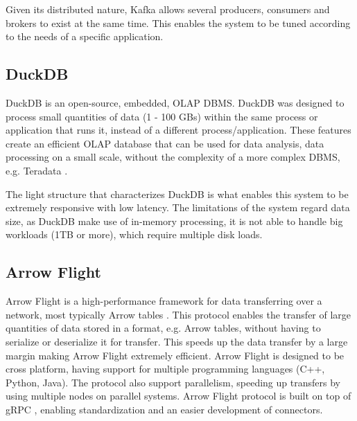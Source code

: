 Given its distributed nature, Kafka allows several producers, consumers and brokers to exist at the same time. This enables the system to be tuned according to the needs of a specific application. 

\subsection{DuckDB}

DuckDB \cite{raasveldtDuckDBEmbeddableAnalytical2019} is an open-source, embedded, \gls{OLAP} \gls{DBMS}. DuckDB was designed to process small quantities of data (1 - 100 GBs) within the same process or application that runs it, instead of a different process/application. These features create an efficient \gls{OLAP} database that can be used for data analysis, data processing on a small scale, without the complexity of a more complex \gls{DBMS}, e.g. Teradata \cite{shahImproveYourOLAP}. 

The light structure that characterizes DuckDB is what enables this system to be extremely responsive with low latency. The limitations of the system regard data size, as DuckDB make use of in-memory processing, it is not able to handle big workloads (1TB or more), which require multiple disk loads.

\subsection{Arrow Flight}

Arrow Flight is a high-performance framework for data transferring over a network, most typically Arrow tables \cite{wesmIntroducingApacheArrow2019}. This protocol enables the transfer of large quantities of data stored in a format, e.g. Arrow tables, without having to serialize or deserialize it for transfer. This speeds up the data transfer by a large margin making Arrow Flight extremely efficient. Arrow Flight is designed to be cross platform, having support for multiple programming languages (C++, Python, Java). The protocol also support parallelism, speeding up transfers by using multiple nodes on parallel systems. Arrow Flight protocol is built on top of gRPC \cite{GRPC}, enabling standardization and an easier development of connectors. 